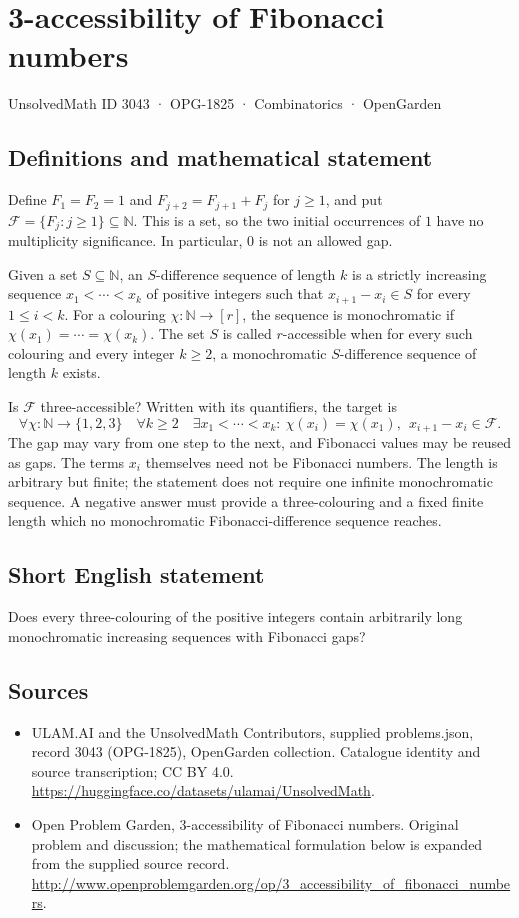 \documentclass[11pt,a4paper]{article}
\begin{document}
\section*{3-accessibility of Fibonacci numbers}\label{3043}
{\small UnsolvedMath ID 3043 · OPG-1825 · Combinatorics · OpenGarden}
\subsection{Definitions and mathematical statement}
Define $F_1=F_2=1$ and $F_{j+2}=F_{j+1}+F_j$ for $j\ge1$, and put
$\mathcal F=\{F_j:j\ge1\}\subseteq\mathbb N$. This is a set, so the two
initial occurrences of $1$ have no multiplicity significance. In particular,
$0$ is not an allowed gap.

Given a set $S\subseteq\mathbb N$, an $S$-difference sequence of length
$k$ is a strictly increasing sequence $x_1<\cdots<x_k$ of positive integers
such that $x_{i+1}-x_i\in S$ for every $1\le i<k$.
For a colouring $\chi:\mathbb N\to[r]$, the sequence is monochromatic if
$\chi(x_1)=\cdots=\chi(x_k)$. The set $S$ is called $r$-accessible when
for every such colouring and every integer $k\ge2$, a monochromatic
$S$-difference sequence of length $k$ exists.

Is $\mathcal F$ three-accessible? Written with its quantifiers, the target is
\[
 \forall\chi:\mathbb N\to\{1,2,3\}\quad\forall k\ge2\quad
 \exists x_1<\cdots<x_k:
 \ \chi(x_i)=\chi(x_1),\ \ x_{i+1}-x_i\in\mathcal F.
\]
The gap may vary from one step to the next, and Fibonacci values may be
reused as gaps. The terms $x_i$ themselves need not be Fibonacci numbers.
The length is arbitrary but finite; the statement does not require one
infinite monochromatic sequence. A negative answer must provide a
three-colouring and a fixed finite length which no monochromatic
Fibonacci-difference sequence reaches.
\subsection{Short English statement}
Does every three-colouring of the positive integers contain arbitrarily long monochromatic increasing sequences with Fibonacci gaps?
\subsection{Sources}
\begin{itemize}
\item[S1] ULAM.AI and the UnsolvedMath Contributors, supplied problems.json, record 3043 (OPG-1825), OpenGarden collection. Catalogue identity and source transcription; CC BY 4.0.
\url{https://huggingface.co/datasets/ulamai/UnsolvedMath}.
\item[S2] Open Problem Garden, 3-accessibility of Fibonacci numbers. Original problem and discussion; the mathematical formulation below is expanded from the supplied source record.
\url{http://www.openproblemgarden.org/op/3_accessibility_of_fibonacci_numbers}.
\end{itemize}
\end{document}
